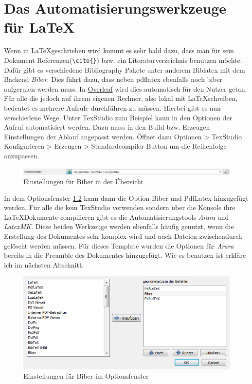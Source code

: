 \chapter{Das Automatisierungswerkzeuge für \LaTeX}
\label{automate}
Wenn in \LaTeX geschrieben wird kommt es sehr bald dazu, dass man für sein Dokument Referenzen(\verb|\cite{}|) bzw. ein Literaturverzeichnis benutzen möchte. Dafür gibt es verschiedene Bibliography Pakete unter anderem Biblatex mit dem Backend \emph{Biber}. Dies führt dazu, dass neben pdflatex ebenfalls noch biber aufgerufen werden muss. In \href{www.overleaf.com}{Overleaf} wird dies automatisch für den Nutzer getan. Für alle die jedoch auf ihrem eigenen Rechner, also lokal mit \LaTeX schreiben, bedeutet es mehrere Aufrufe durchführen zu müssen. Hierbei gibt es nun verschiedene Wege. Unter TexStudio zum Beispiel kann in den Optionen der Aufruf automatisiert werden. Dazu muss in den Build bzw. Erzeugen Einstellungen der Ablauf angepasst werden. Öffnet dazu Optionen > TexStudio Konfigurieren > Erzeugen > Standardcompiler Button um die Reihenfolge anzupassen. 
\begin{figure}[ht]
	\centering
	\includegraphics[width=\textwidth]{images/texstudio_option_build.PNG}
	\caption{Einstellungen für Biber in der Übersicht}
	\label{figbuild}
\end{figure}

In dem Optionsfenster \ref{figbuildOptions} kann dann die Option Biber und PdfLatex hinzugefügt werden. Für alle die kein TexStudio verwenden sondern über die Konsole ihre \LaTeX Dokumente compilieren gibt es die Automatisierungstools \emph{Arara} und \emph{LatexMK}. Diese beiden Werkzeuge werden ebenfalls häufig genutzt, wenn die Erstellung des Dokumentes sehr komplex wird und auch Dateien zwischendurch gelöscht werden müssen. Für dieses Template wurden die Optionen für \emph{Arara} bereits in die Preamble des Dokumentes hinzugefügt. Wie es benutzen ist erkläre ich im nächsten Abschnitt.

\begin{figure}[ht]
	\centering
	\includegraphics[width=\textwidth]{images/texstudio_optionwindow_build.PNG}
	\caption{Einstellungen für Biber im Optionsfenster}
	\label{figbuildOptions}
\end{figure}


